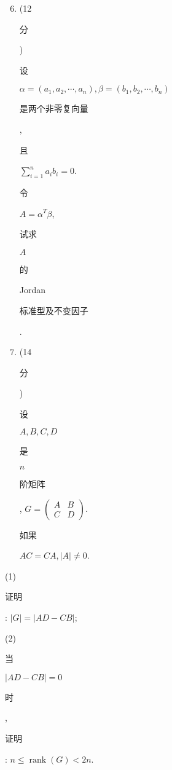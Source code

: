 \documentclass[10pt]{article}
\begin{document}
\begin{enumerate}
  \setcounter{enumi}{5}
  \item (12 \begin{CJK}{UTF8}{mj}分\end{CJK}) \begin{CJK}{UTF8}{mj}设\end{CJK} $\alpha=\left(a_{1}, a_{2}, \cdots, a_{n}\right), \beta=\left(b_{1}, b_{2}, \cdots, b_{n}\right)$ \begin{CJK}{UTF8}{mj}是两个非零复向量\end{CJK}, \begin{CJK}{UTF8}{mj}且\end{CJK} $\sum_{i=1}^{n} a_{i} b_{i}=0$. \begin{CJK}{UTF8}{mj}令\end{CJK} $A=\alpha^{T} \beta$, \begin{CJK}{UTF8}{mj}试求\end{CJK} $A$ \begin{CJK}{UTF8}{mj}的\end{CJK} Jordan \begin{CJK}{UTF8}{mj}标准型及不变因子\end{CJK}.

  \item (14 \begin{CJK}{UTF8}{mj}分\end{CJK}) \begin{CJK}{UTF8}{mj}设\end{CJK} $A, B, C, D$ \begin{CJK}{UTF8}{mj}是\end{CJK} $n$ \begin{CJK}{UTF8}{mj}阶矩阵\end{CJK}, $G=\left(\begin{array}{cc}A & B \\ C & D\end{array}\right)$. \begin{CJK}{UTF8}{mj}如果\end{CJK} $A C=C A,|A| \neq 0$.

\end{enumerate}
(1) \begin{CJK}{UTF8}{mj}证明\end{CJK}: $|G|=|A D-C B|$;

(2) \begin{CJK}{UTF8}{mj}当\end{CJK} $|A D-C B|=0$ \begin{CJK}{UTF8}{mj}时\end{CJK}, \begin{CJK}{UTF8}{mj}证明\end{CJK}: $n \leqslant \operatorname{rank}(G)<2 n$.
\end{document}
